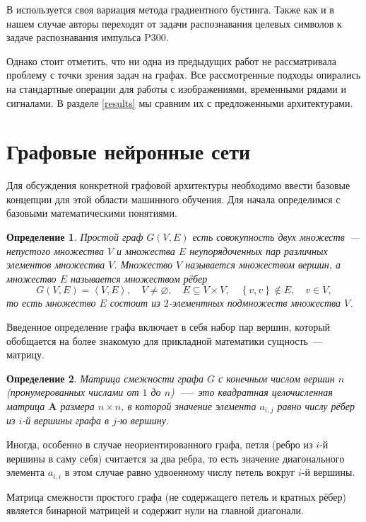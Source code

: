 \documentclass[12pt]{article}
\newtheorem{Def}{Определение}
\begin{document}
В \cite{hoffmann2005boosting} используется своя вариация метода градиентного бустинга. Также как и в нашем случае авторы переходят от задачи распознавания целевых символов к задаче распознавания импульса P300.

Однако стоит отметить, что ни одна из предыдущих работ не рассматривала проблему с точки зрения задач на графах. Все рассмотренные подходы опирались на стандартные операции для работы с изображениями, временными рядами и сигналами. В разделе \ref{results} мы сравним их с предложенными архитектурами.

\section{Графовые нейронные сети}

Для обсуждения конкретной графовой архитектуры необходимо ввести базовые концепции для этой области машинного обучения. Для начала определимся с базовыми математическими понятиями. 

\begin{Def}
Простой граф $G(V, E)$ есть совокупность двух множеств~--- непустого множества $V$ и множества $E$ неупорядоченных пар различных элементов множества $V$. Множество $V$ называется множеством вершин, а множество $E$ называется множеством рёбер
$$ 
G(V,E)= \left\langle V,E \right\rangle , \quad V \neq \varnothing ,\quad E \subseteq V\times V,\quad \left\{v,v\right\}\notin E,\quad v\in V,
$$
то есть множество $E$ состоит из $2$-элементных подмножеств множества $V$.
\end{Def}

Введенное определение графа включает в себя набор пар вершин, который обобщается на более знакомую для прикладной математики сущность~--- матрицу.

\begin{Def}
Матрица смежности графа $G$ с конечным числом вершин $n$ (пронумерованных числами от $1$ до $n$)~--— это квадратная целочисленная матрица ${\mathbf  A}$ размера $n\times n$, в которой значение элемента $a_{i,j}$ равно числу рёбер из $i$-й вершины графа в $j$-ю вершину.
\end{Def}

Иногда, особенно в случае неориентированного графа, петля (ребро из $i$-й вершины в саму себя) считается за два ребра, то есть значение диагонального элемента ${\displaystyle a_{i,i}}$ в этом случае равно удвоенному числу петель вокруг $i$-й вершины.

Матрица смежности простого графа (не содержащего петель и кратных рёбер) является бинарной матрицей и содержит нули на главной диагонали.
\end{document}
